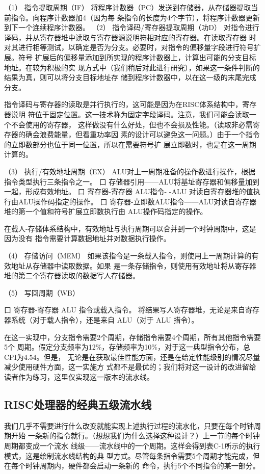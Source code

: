 （1） 指令提取周期（IF）
将程序计数器（PC）发送到存储器，从存储器提取当前指令。向程序计数器加4（因为每
条指令的长度为4个字节），将程序计数器更新到下一个连续程序计数器。
（2） 指令译码/寄存器提取周期（功D）
对指令进行译码，并从寄存器堆中读取与寄存器源说明符相对应的寄存器。在读取寄存器
时对其进行相等测试，以确定是否为分支。必要时，对指令的偏移量字段进行符号扩展。符号
扩展后的偏移量添加到所实现的程序计数器上，计算出可能的分支目标地址。在较为积极的实
现方式中（我们稍后对此进行研究），如果这一条件判断的结果为真，则可以将分支目标地址存
储到程序计数器中，以在这一级的末尾完成分支。

指令译码与寄存器的读取是并行执行的，这可能是因为在RISC体系结构中，寄存器说明
符位于固定位置。这一技术称为固定字段译码。注意，我们可能会读取一个不会使用的寄存器，
这样做没有什么好处，但也不会损及性能。（读取非必需寄存器的确会浪费能量，但看重功率因
素的设计可以避免这一问题。）由于一个指令的立即数部分也位于同一位置，所以在需要符号扩
展立即数时，也是在这一周期计算的。

（3） 执行/有效地址周期（EX）
ALU对上一周期准备的操作数进行操作，根据指令类型执行三条指令之一。
口 存储器引用——ALU将基址寄存器和偏移量加到一起，形成有效地址。
口 寄存器-寄存器 ALU指令-
-ALU 对读自寄存器堆的值执行由ALU操作码指定的操作。
口 寄存器-立即数ALU指令——ALU对读自寄存器堆的第一个值和符号扩展立即数执行由
ALU操作码指定的操作。

在载人-存储体系结构中，有效地址与执行周期可以合并到一个时钟周期中，这是因为没有
指令需要计算数据地址并对数据执行操作。

（4） 存储访问（MEM）
如果该指令是一条载入指令，则使用上一周期计算的有效地址从存储器中读取数据。如果
是一条存储指令，则使用有效地址将从寄存器堆的第二个寄存器读取的数据写人存储器。

（5） 写回周期（WB）

口 寄存器-寄存器 ALU 指令或载入指令。
将结果写人寄存器堆，无论是来自寄存器系统（对于载人指令），还是来自 ALU（对于 ALU
措令）。

在这一实现中，分支指令需要2个周期，存储指令需要4个周期，所有其他指令需要5个
周期。假定分支频率为12\%，存储频率为10\%，对于这一典型指令分布，总CPI为4.54。但是，
无论是在获取最佳性能方面，还是在给定性能级别的情况尽量减少使用硬件方面，这一实施方
式都不是最优的；我们将对这一设计的改进留给读者作为练习，这里仅实现这一版本的流水线。

\subsection{RISC处理器的经典五级流水线}
我们几乎不需要进行什么改变就能实现上述执行过程的流水化，只要在每个时钟周期开始
一条新的指令就行。（想想我们为什么选择这种设计？）上一节的每个时钟周期都变成一个流水
线级——流水线中的一个周期。这样会得到表C-1所示的执行模式，这是绘制流水线结构的典
型方式。尽管每条指令需要5个周期才能完成，但在每个时钟周期内，硬件都会启动一条新的
命令，执行5个不同指令的某一部分。

